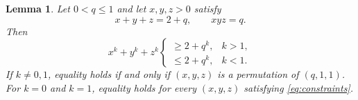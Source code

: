 \documentclass[10pt,a4paper]{amsart}
\newtheorem{lemma}[theorem]{Lemma}
\begin{document}
\begin{lemma}\label{lem:power}
Let $0<q\le 1$ and let $x,y,z>0$ satisfy
\begin{equation}\label{eq:constraints}
 x+y+z=2+q,\qquad xyz=q.
\end{equation}
Then
\begin{equation}\label{eq:power}
 x^k+y^k+z^k
 \begin{cases}
 \ge 2+q^k, & k>1,\\[2mm]
 \le 2+q^k, & k<1.
 \end{cases}
\end{equation}
If $k\ne0,1$, equality holds if and only if $(x,y,z)$ is a permutation of
$(q,1,1)$. For $k=0$ and $k=1$, equality holds for every
$(x,y,z)$ satisfying \eqref{eq:constraints}.
\end{lemma}
\end{document}
